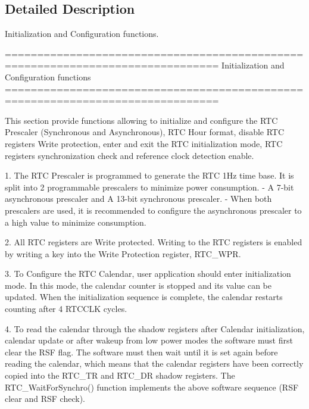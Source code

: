 \subsection{Detailed Description}
Initialization and Configuration functions. \begin{DoxyVerb} ===============================================================================
                 Initialization and Configuration functions
 ===============================================================================

  This section provide functions allowing to initialize and configure the RTC
  Prescaler (Synchronous and Asynchronous), RTC Hour format, disable RTC registers
  Write protection, enter and exit the RTC initialization mode, RTC registers
  synchronization check and reference clock detection enable.
  
  1. The RTC Prescaler is programmed to generate the RTC 1Hz time base. It is
     split into 2 programmable prescalers to minimize power consumption.
     - A 7-bit asynchronous prescaler and A 13-bit synchronous prescaler.
     - When both prescalers are used, it is recommended to configure the asynchronous
       prescaler to a high value to minimize consumption.

  2. All RTC registers are Write protected. Writing to the RTC registers
     is enabled by writing a key into the Write Protection register, RTC_WPR.

  3. To Configure the RTC Calendar, user application should enter initialization
     mode. In this mode, the calendar counter is stopped and its value can be 
     updated. When the initialization sequence is complete, the calendar restarts 
     counting after 4 RTCCLK cycles.

  4. To read the calendar through the shadow registers after Calendar initialization,
     calendar update or after wakeup from low power modes the software must first 
     clear the RSF flag. The software must then wait until it is set again before 
     reading the calendar, which means that the calendar registers have been 
     correctly copied into the RTC_TR and RTC_DR shadow registers.
     The RTC_WaitForSynchro() function implements the above software sequence 
     (RSF clear and RSF check).\end{DoxyVerb}
 


